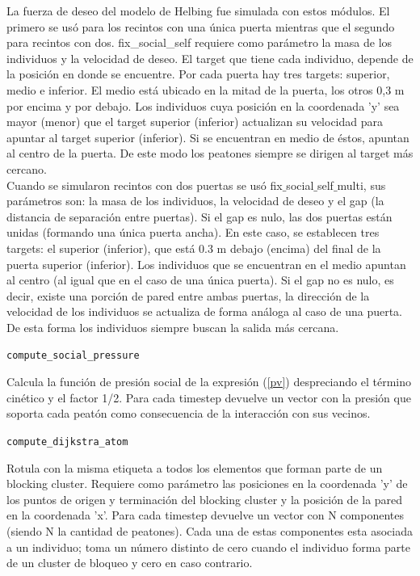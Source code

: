 La fuerza de deseo del modelo de Helbing fue simulada con estos módulos. El primero se usó para los recintos con una única puerta mientras que el segundo para recintos con dos. 
fix\_social\_self requiere como parámetro la masa de los individuos y la velocidad de deseo. El target que tiene cada individuo, depende de la posición en donde se encuentre. Por cada puerta hay tres targets: superior, medio e inferior. El medio está ubicado en la mitad de la puerta, los otros 0,3 m por encima y por debajo.  Los individuos cuya posición en la coordenada 'y' sea mayor (menor) que el target superior (inferior) actualizan su velocidad para apuntar al target superior (inferior). Si se encuentran en medio de éstos, apuntan al centro de la puerta. De este modo los peatones siempre se dirigen al target más cercano.\\  

Cuando se simularon recintos con dos puertas se usó fix$\_$social$\_$self$\_$multi, sus parámetros son: la masa de los individuos, la velocidad de deseo y el gap (la distancia de separación entre puertas). Si el gap es nulo, las dos puertas están unidas (formando una única puerta ancha). En este caso, se establecen tres targets: el superior (inferior), que está 0.3 m debajo (encima) del final de la puerta superior (inferior). Los individuos que se encuentran en el medio apuntan al centro (al igual que en el caso de una única puerta).
Si el gap no es nulo, es decir, existe una porción de pared entre ambas puertas, la dirección de la velocidad de los individuos se actualiza de forma análoga al caso de una puerta. De esta forma los individuos siempre buscan la salida más cercana. 

{\Large {\tt compute\_social\_pressure}}

Calcula la función de presión social de la expresión (\eqref{pv}) despreciando el término cinético y el factor 1/2. Para cada timestep devuelve un vector con la presión que soporta cada peatón como consecuencia de la interacción con sus vecinos. 

{\Large \tt {compute\_dijkstra\_atom}}

Rotula con la misma etiqueta a todos los elementos que forman parte de un blocking cluster. Requiere como parámetro las posiciones en la coordenada 'y' de los puntos de origen y terminación del blocking cluster y la posición de la pared en la coordenada 'x'. Para cada timestep devuelve un vector con N componentes (siendo N la cantidad de peatones). Cada una de estas componentes esta asociada a un individuo; toma un número distinto de cero cuando el individuo forma parte de un cluster de bloqueo y cero en caso contrario.

